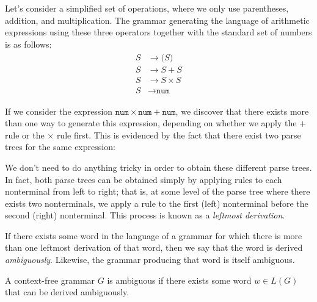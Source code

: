 Let's consider a simplified set of operations, where we only use parentheses, addition, and multiplication. The grammar generating the language of arithmetic expressions using these three operators together with the standard set of numbers is as follows:
\begin{align}
\label{eq:grammararithmeticbad}
\begin{split}
S	&\rightarrow \texttt{(} S \texttt{)} \\
S	&\rightarrow S + S \\
S	&\rightarrow S \times S \\
S	&\rightarrow \texttt{num}
\end{split}
\end{align}

If we consider the expression $\texttt{num} \times \texttt{num} + \texttt{num}$, we discover that there exists more than one way to generate this expression, depending on whether we apply the $+$ rule or the $\times$ rule first. This is evidenced by the fact that there exist two parse trees for the same expression:

\begin{center}
\end{center}

We don't need to do anything tricky in order to obtain these different parse trees. In fact, both parse trees can be obtained simply by applying rules to each nonterminal from left to right; that is, at some level of the parse tree where there exists two nonterminals, we apply a rule to the first (left) nonterminal before the second (right) nonterminal. This process is known as a \emph{leftmost derivation}.

If there exists some word in the language of a grammar for which there is more than one leftmost derivation of that word, then we say that the word is derived \emph{ambiguously}. Likewise, the grammar producing that word is itself ambiguous.

\begin{definition}
A context-free grammar $G$ is ambiguous if there exists some word $w \in L(G)$ that can be derived ambiguously.
\end{definition}


